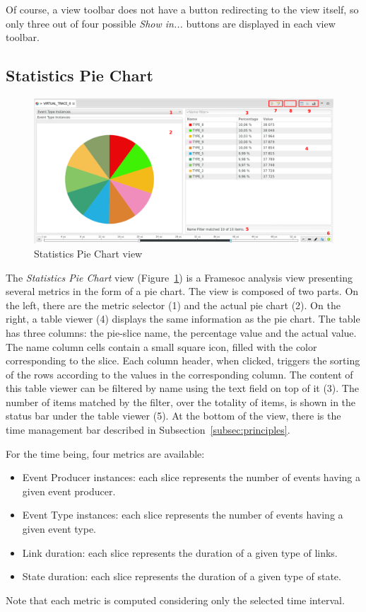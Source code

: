 \documentclass[twoside]{article}
\begin{document}
\begin{sloppypar}
Of course, a view toolbar does not have a button redirecting to the view itself, so only three out of four possible \emph{Show in...} buttons are displayed in each view toolbar.

\subsection{Statistics Pie Chart}
\label{subsec:pie}

\begin{figure}[h!]
  \centering
    \includegraphics[width=1.0\textwidth]{images/pie.pdf}
  \caption{Statistics Pie Chart view}
  \label{fig:pie_chart}
\end{figure}

The \emph{Statistics Pie Chart} view (Figure~\ref{fig:pie_chart}) is a Framesoc analysis view presenting several metrics in the form of a pie chart.
The view is composed of two parts.
On the left, there are the metric selector (\num{1}) and the actual pie chart (\num{2}).
On the right, a table viewer (\num{4}) displays the same information as the pie chart. 
The table has three columns: the pie-slice name, the percentage value and the actual value. 
The name column cells contain a small square icon, filled with the color corresponding to the slice.
Each column header, when clicked, triggers the sorting of the rows according to the values in the corresponding column.
The content of this table viewer can be filtered by name using the text field on top of it (\num{3}). 
The number of items matched by the filter, over the totality of items, is shown in the status bar under the table viewer (\num{5}).
At the bottom of the view, there is the time management bar described in Subsection~\ref{subsec:principles}.

For the time being, four metrics are available: 
\begin{itemize}
 \item Event Producer instances: each slice represents the number of events having a given event producer.
 \item Event Type instances: each slice represents the number of events having a given event type.
 \item Link duration: each slice represents the duration of a given type of links.
 \item State duration: each slice represents the duration of a given type of state.
\end{itemize}
Note that each metric is computed considering only the selected time interval.


\end{sloppypar}
\end{document}
